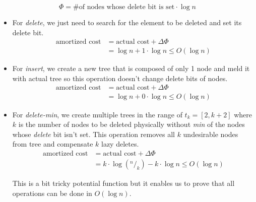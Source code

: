 \begin{enumerate}
 $$
  \Phi = \text{\# of nodes whose delete bit is set} \cdot \log n
 $$
 
 \begin{itemize}
   \item For \textit{delete}, we just need to search for the element to be deleted and set its delete bit.
   \begin{align*}
    \text{amortized cost} &= \text{actual cost} + \Delta\Phi \\                          
                          &= \log n + 1 \cdot \log n \leq O(\log n)   
   \end{align*}
   
   \item For \textit{insert}, we create a new tree that is composed of only 1 node and meld it with actual tree so this operation doesn't change delete bits of nodes.
   \begin{align*}
    \text{amortized cost} &= \text{actual cost} + \Delta\Phi \\                          
                          &= \log n + 0 \cdot \log n \leq O(\log n)   
   \end{align*}
   
   \item For \textit{delete-min}, we create multiple trees in the range of $t_k = [2, k+2]$ where $k$ is the number of nodes to be deleted physically without \textit{min} of the nodes whose \textit{delete} bit isn't set. This operation removes all $k$ undesirable nodes from tree and compensate $k$ lazy deletes.
   \begin{align*}
    \text{amortized cost} &= \text{actual cost} + \Delta\Phi \\                          
                          &= k \cdot \log (^n/_k) - k \cdot \log n \leq O(\log n)   
   \end{align*}
   
   This is a bit tricky potential function but it enables us to prove that all operations can be done in $O(\log n)$.
   
 \end{itemize}

\end{enumerate}